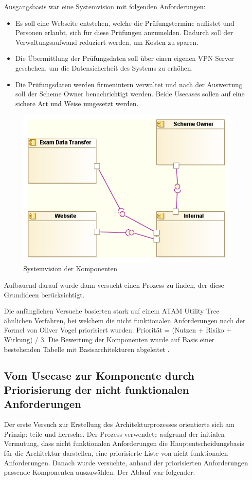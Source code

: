 Ausgangsbasis war eine Systemvision mit folgenden Anforderungen:

\begin{itemize}
  \item Es soll eine Webseite entstehen, welche die Prüfungstermine auflistet und Personen erlaubt, sich für diese Prüfungen anzumelden. Dadurch soll der Verwaltungsaufwand reduziert werden, um Kosten zu sparen.
  \item Die Übermittlung der Prüfungsdaten soll über einen eigenen VPN Server geschehen, um die Datensicherheit des Systems zu erhöhen.
  \item Die Prüfungsdaten werden firmenintern verwaltet und nach der Auswertung soll der Scheme Owner benachrichtigt werden. Beide Usecases sollen auf eine sichere Art und Weise umgesetzt werden.
\end{itemize}

\begin{figure}[!htbp]
    \centering
    \includegraphics[scale=0.6]{uml/vision.png}
    \caption{Systemvision der Komponenten}
\end{figure}

Aufbauend darauf wurde dann versucht einen Prozess zu finden, der diese Grundideen berücksichtigt.

Die anfänglichen Versuche basierten stark auf einem ATAM Utility Tree ähnlichen Verfahren, bei welchem die nicht funktionalen Anforderungen nach der Formel von Oliver Vogel priorisiert wurden: \glqq Priorität = (Nutzen + Risiko + Wirkung) / 3\grqq \cite[S. 374]{softarch}. Die Bewertung der Komponenten wurde auf Basis einer bestehenden Tabelle mit Basisarchitekturen abgeleitet \cite[S. 179]{review}.


\subsection{Vom Usecase zur Komponente durch Priorisierung der nicht funktionalen Anforderungen}
Der erste Versuch zur Erstellung des Architekturprozesses orientierte sich am Prinzip: teile und herrsche. Der Prozess verwendete aufgrund der initialen Vermutung, dass nicht funktionalen Anforderungen die Hauptentscheidungsbasis für die Architektur darstellen, eine priorisierte Liste von nicht funktionalen Anforderungen. Danach wurde versuchte, anhand der priorisierten Anforderungen passende Komponenten auszuwählen. Der Ablauf war folgender:

